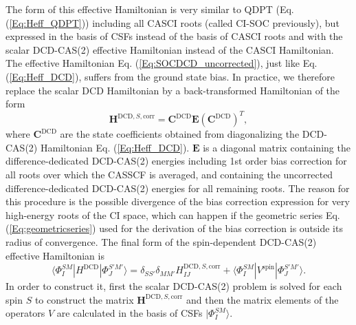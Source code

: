 The form of this effective Hamiltonian is very similar to QDPT (Eq. (\ref{Eq:Heff_QDPT})) including all CASCI roots (called CI-SOC previously\cite{GanyuN_2013_104113}), but expressed in the basis of CSFs instead of the basis of CASCI roots and with the scalar DCD-CAS(2) effective Hamiltonian instead of the CASCI Hamiltonian.
The effective Hamiltonian Eq. (\ref{Eq:SOCDCD_uncorrected}), just like Eq. (\ref{Eq:Heff_DCD}), suffers from the ground state bias. In practice, we therefore replace the scalar DCD Hamiltonian by a back-transformed Hamiltonian of the form
	\begin{equation}
	\label{Eq:HDCD_backtransformed}
	{{\mathbf{H}}^{{\text{DCD}},S,{\text{corr}}}} = {{\mathbf{C}}^{{\text{DCD}}}}{\mathbf{E}}{({{\mathbf{C}}^{{\text{DCD}}}})^T},
	\end{equation} 
where ${{\mathbf{C}}^{{\text{DCD}}}}$ are the state coefficients obtained from diagonalizing the DCD-CAS(2) Hamiltonian Eq. (\ref{Eq:Heff_DCD}). ${\mathbf{E}}$ is a diagonal matrix containing the difference-dedicated DCD-CAS(2) energies including 1st order bias correction for all roots over which the CASSCF is averaged, and containing the uncorrected difference-dedicated DCD-CAS(2) energies for all remaining roots. The reason for this procedure is the possible divergence of the bias correction expression for very high-energy roots of the CI space, which can happen if the geometric series Eq. (\ref{Eq:geometricseries}) used for the derivation of the bias correction is outside its radius of convergence. The final form of the spin-dependent DCD-CAS(2) effective Hamiltonian is\cite{LangN_2019_104104}
	\begin{equation}
	\label{Eq:spindepDCD}
	\langle \Phi _I^{SM}|{H^{{\text{DCD}}}}|\Phi _J^{S'M'}\rangle  = {\delta _{SS'}}{\delta _{MM'}}H_{IJ}^{{\text{DCD}},S,{\text{corr}}} + \langle \Phi _I^{SM}|V^\text{spin}|\Phi _J^{S'M'}\rangle. 
	\end{equation} 	
In order to construct it, first the scalar DCD-CAS(2) problem is solved for each spin $S$ to construct the matrix ${{\mathbf{H}}^{{\text{DCD}},S,{\text{corr}}}}$ and then the matrix elements of the operators $V$ are calculated in the basis of CSFs $|\Phi _I^{SM}\rangle $.

